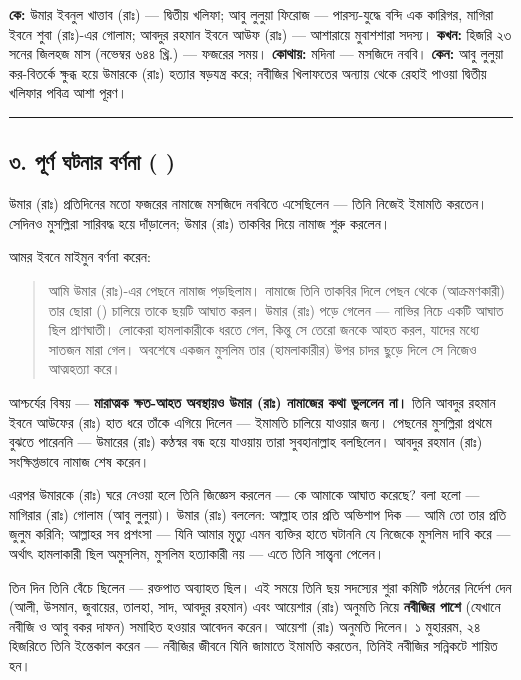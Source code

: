\textbf{কে:} উমার ইবনুল খাত্তাব (রাঃ) — দ্বিতীয় খলিফা; আবু লুলুয়া ফিরোজ — পারস্য-যুদ্ধে বন্দি এক কারিগর, মাগিরা ইবনে শুবা (রাঃ)-এর গোলাম; আবদুর রহমান ইবনে আউফ (রাঃ) — আশারায়ে মুবাশশারা সদস্য।
\textbf{কখন:} হিজরি ২৩ সনের জিলহজ মাস (নভেম্বর ৬৪৪ খ্রি.) — ফজরের সময়।
\textbf{কোথায়:} মদিনা — মসজিদে নববি।
\textbf{কেন:} আবু লুলুয়া কর-বিতর্কে ক্ষুব্ধ হয়ে উমারকে (রাঃ) হত্যার ষড়যন্ত্র করে; নবীজির খিলাফতের অন্যায় থেকে রেহাই পাওয়া দ্বিতীয় খলিফার পবিত্র আশা পূরণ।

\medskip\hrule\medskip

\subsection*{৩. পূর্ণ ঘটনার বর্ণনা (  )}

উমার (রাঃ) প্রতিদিনের মতো ফজরের নামাজে মসজিদে নববিতে এসেছিলেন — তিনি নিজেই ইমামতি করতেন। সেদিনও মুসল্লিরা সারিবদ্ধ হয়ে দাঁড়ালেন; উমার (রাঃ) তাকবির দিয়ে নামাজ শুরু করলেন।

আমর ইবনে মাইমুন বর্ণনা করেন:

\begin{quote}
আমি উমার (রাঃ)-এর পেছনে নামাজ পড়ছিলাম। নামাজে তিনি তাকবির দিলে পেছন থেকে (আক্রমণকারী) তার ছোরা () চালিয়ে তাকে ছয়টি আঘাত করল। উমার (রাঃ) পড়ে গেলেন — নাভির নিচে একটি আঘাত ছিল প্রাণঘাতী। লোকেরা হামলাকারীকে ধরতে গেল, কিন্তু সে তেরো জনকে আহত করল, যাদের মধ্যে সাতজন মারা গেল। অবশেষে একজন মুসলিম তার (হামলাকারীর) উপর চাদর ছুড়ে দিলে সে নিজেও আত্মহত্যা করে।
\end{quote}

আশ্চর্যের বিষয় — \textbf{মারাত্মক ক্ষত-আহত অবস্থায়ও উমার (রাঃ) নামাজের কথা ভুললেন না।} তিনি আবদুর রহমান ইবনে আউফের (রাঃ) হাত ধরে তাঁকে এগিয়ে দিলেন — ইমামতি চালিয়ে যাওয়ার জন্য। পেছনের মুসল্লিরা প্রথমে বুঝতে পারেননি — উমারের (রাঃ) কণ্ঠস্বর বন্ধ হয়ে যাওয়ায় তারা সুবহানাল্লাহ বলছিলেন। আবদুর রহমান (রাঃ) সংক্ষিপ্তভাবে নামাজ শেষ করেন।

এরপর উমারকে (রাঃ) ঘরে নেওয়া হলে তিনি জিজ্ঞেস করলেন — কে আমাকে আঘাত করেছে? বলা হলো — মাগিরার (রাঃ) গোলাম (আবু লুলুয়া)। উমার (রাঃ) বললেন: আল্লাহ তার প্রতি অভিশাপ দিক — আমি তো তার প্রতি জুলুম করিনি; আল্লাহর সব প্রশংসা — যিনি আমার মৃত্যু এমন ব্যক্তির হাতে ঘটাননি যে নিজেকে মুসলিম দাবি করে — অর্থাৎ হামলাকারী ছিল অমুসলিম, মুসলিম হত্যাকারী নয় — এতে তিনি সান্ত্বনা পেলেন।

তিন দিন তিনি বেঁচে ছিলেন — রক্তপাত অব্যাহত ছিল। এই সময়ে তিনি ছয় সদস্যের শুরা কমিটি গঠনের নির্দেশ দেন (আলী, উসমান, জুবায়ের, তালহা, সাদ, আবদুর রহমান) এবং আয়েশার (রাঃ) অনুমতি নিয়ে \textbf{নবীজির পাশে} (যেখানে নবীজি ও আবু বকর দাফন) সমাহিত হওয়ার আবেদন করেন। আয়েশা (রাঃ) অনুমতি দিলেন। ১ মুহাররম, ২৪ হিজরিতে তিনি ইন্তেকাল করেন — নবীজির জীবনে যিনি জামাতে ইমামতি করতেন, তিনিই নবীজির সন্নিকটে শায়িত হন।

